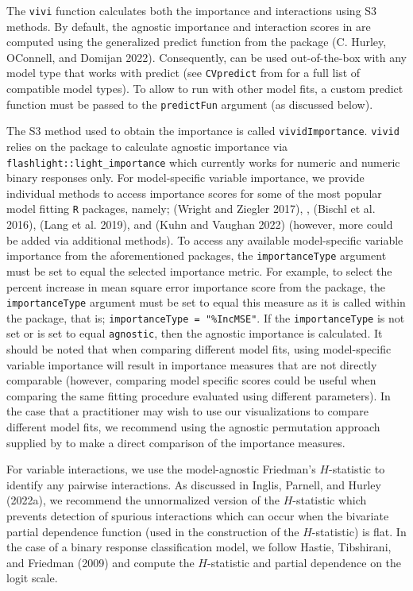 The \texttt{vivi} function calculates both the importance and interactions using S3 methods. By default, the agnostic importance and interaction scores in  are computed using the generalized predict function from the  package (C. Hurley, OConnell, and Domijan 2022). Consequently,  can be used out-of-the-box with any model type that works with  predict (see \texttt{CVpredict} from  for a full list of compatible model types). To allow  to run with other model fits, a custom predict function must be passed to the \texttt{predictFun} argument (as discussed below).

The S3 method used to obtain the importance is called \texttt{vividImportance}. \texttt{vivid} relies on the  package to calculate agnostic importance via \texttt{flashlight::light\_importance} which currently works for numeric and numeric binary responses only. For model-specific variable importance, we provide individual methods to access importance scores for some of the most popular model fitting \texttt{R} packages, namely;  (Wright and Ziegler 2017), ,  (Bischl et al. 2016),  (Lang et al. 2019), and  (Kuhn and Vaughan 2022) (however, more could be added via additional methods). To access any available model-specific variable importance from the aforementioned packages, the \texttt{importanceType} argument must be set to equal the selected importance metric. For example, to select the percent increase in mean square error importance score from the  package, the \texttt{importanceType} argument must be set to equal this measure as it is called within the  package, that is; \texttt{importanceType\ =\ "\%IncMSE"}. If the \texttt{importanceType} is not set or is set to equal \texttt{agnostic}, then the agnostic importance is calculated. It should be noted that when comparing different model fits, using model-specific variable importance will result in importance measures that are not directly comparable (however, comparing model specific scores could be useful when comparing the same fitting procedure evaluated using different parameters). In the case that a practitioner may wish to use our visualizations to compare different model fits, we recommend using the agnostic permutation approach supplied by  to make a direct comparison of the importance measures.

For variable interactions, we use the model-agnostic Friedman's \(H\)-statistic to identify any pairwise interactions. As discussed in Inglis, Parnell, and Hurley (2022a), we recommend the unnormalized version of the \(H\)-statistic which prevents detection of spurious interactions which can occur when the bivariate partial dependence function (used in the construction of the \(H\)-statistic) is flat. In the case of a binary response classification model, we follow Hastie, Tibshirani, and Friedman (2009) and compute the \(H\)-statistic and partial dependence on the logit scale.

